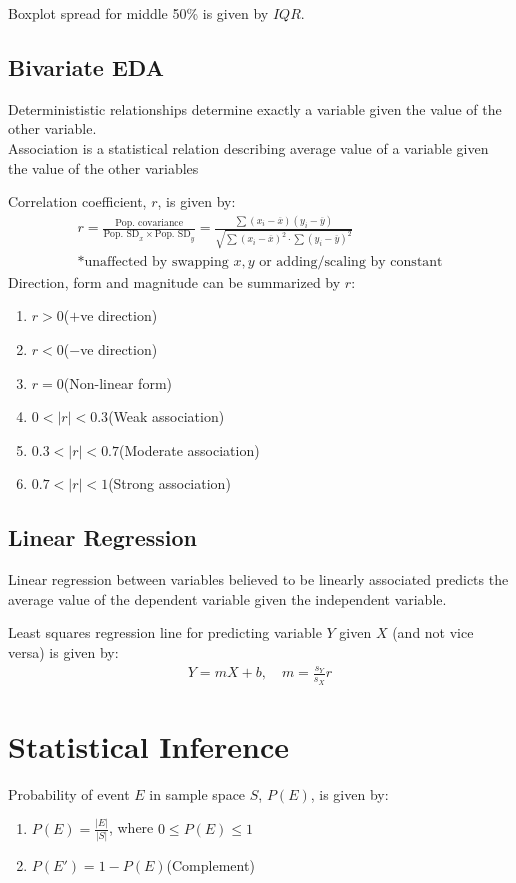 \documentclass[12pt, a4paper]{article}
\begin{document}
\begin{multicols*}{3}
Boxplot spread for middle 50\% is given by $IQR$.

\subsection{Bivariate EDA}
Determinististic relationships determine exactly a variable given the value of the other variable.\\Association is a statistical relation describing average value of a variable given the value of the other variables

Correlation coefficient, $r$, is given by:
\begin{gather*}
  r = \frac{\text{Pop. covariance}}{\text{Pop. SD}_x \times \text{Pop. SD}_y} = \frac{\sum(x_i-\overline{x})(y_i-\overline{y})}{\sqrt{\sum(x_i-\overline{x})^2\cdot\sum(y_i-\overline{y})^2}}\\
  \text{*unaffected by swapping $x,y$ or adding/scaling by constant}
\end{gather*}
Direction, form and magnitude can be summarized by $r$:
\begin{enumerate}[\roman*.]
  \item $r > 0$\hfill($+$ve direction)
  \item $r < 0$\hfill($-$ve direction)
  \item $r=0$\hfill(Non-linear form)
  \item $0 < |r| < 0.3$\hfill(Weak association)
  \item $0.3 < |r| < 0.7$\hfill(Moderate association)
  \item $0.7 < |r| < 1$\hfill(Strong association)
\end{enumerate}

\subsection{Linear Regression}
Linear regression between variables believed to be linearly associated predicts the average value of the dependent variable given the independent variable.

Least squares regression line for predicting variable $Y$ given $X$ (and not vice versa) is given by:
\begin{align*}
  Y = mX + b,\quad m=\frac{s_Y}{s_X}r
\end{align*}
\colbreak

\section{Statistical Inference}
Probability of event $E$ in sample space $S$, $P(E)$, is given by:
\begin{enumerate}[\roman*.]
  \item $P(E) = \frac{|E|}{|S|}$, where $0 \leq P(E) \leq 1$
  \item $P(E') = 1 - P(E)$\hfill(Complement)
\end{enumerate}


\end{multicols*}
\end{document}
